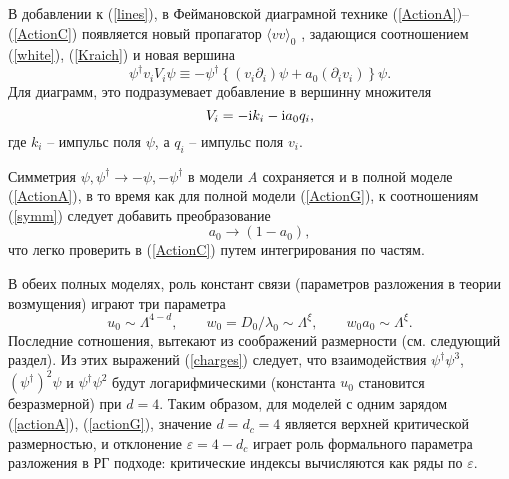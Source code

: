 \documentclass[a4paper,10pt]{article}
\begin{document}
В добавлении к (\ref{lines}), в Феймановской диаграмной технике 
(\ref{ActionA})--(\ref{ActionC}) появляется новый пропагатор
$\langle vv \rangle_{0}$ , задающися соотношением (\ref{white}),
(\ref{Kraich}) и новая вершина
\begin{equation}
\psi^{\dag} v_{i} V_{i} \psi \equiv -
\psi^{\dag}\left\{ (v_{i}\partial_{i}) \psi + a_{0}(\partial_{i}v_{i})
\right\} \psi.
\label{Vertex}
\end{equation}
Для диаграмм, это подразумевает добавление в вершинну множителя
\begin{equation}
V_{i} = - {\rm i} k_{i} - {\rm i} a_{0} q_{i},
\label{VertexF}
\end{equation}
где $k_{i}$ -- импульс поля $\psi$, а
$q_{i}$ -- импульс поля $v_{i}$.

Симметрия $\psi, \psi^{\dag} \to -\psi, -\psi^{\dag}$
в модели
{\it A} сохраняется и в полной моделе (\ref{ActionA}), в то время как для полной модели (\ref{ActionG}), к соотношениям (\ref{symm}) 
следует добавить преобразование
\begin{equation}
a_{0} \to (1-a_{0}),
\label{symmG}
\end{equation}
что легко проверить в (\ref{ActionC}) путем интегрирования по частям.

В обеих полных моделях, роль констант связи (параметров разложения в теории возмущения) играют три параметра
\begin{equation}
u_{0}  \sim \Lambda^{4-d}, \qquad
w_{0} = D_{0}/\lambda_{0} \sim \Lambda^{\xi},
\qquad w_{0}a_{0} \sim \Lambda^{\xi}.
\label{charges}
\end{equation}
Последние сотношения, вытекают из соображений размерности (см. следующий раздел). Из этих выражений (\ref{charges}) следует, что взаимодействия
$\psi^{\dagger}\psi^{3}$, $(\psi^{\dagger})^2\psi$ и
$\psi^{\dagger}\psi^2$ будут логарифмическими (константа $u_{0}$ становится безразмерной) при $d=4$.
Таким образом, для моделей с одним зарядом (\ref{actionA}), (\ref{actionG}),
значение $d=d_{c}=4$ является верхней критической размерностью, и отклонение  $\varepsilon=4-d_{c}$ играет роль формального параметра разложения в РГ 
 подходе: критические индексы вычисляются как ряды по
$\varepsilon$.
\end{document}
